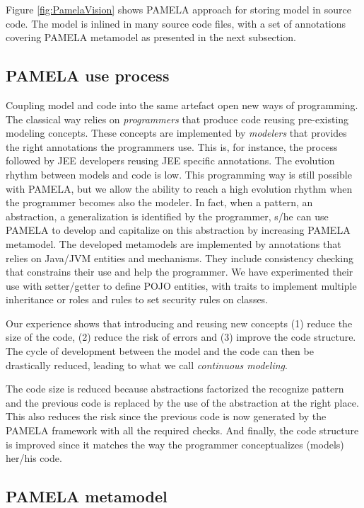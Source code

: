 Figure \ref{fig:PamelaVision} shows PAMELA approach for storing model in source code. The model is inlined in many source code files, with a set of annotations covering PAMELA metamodel as presented in the next subsection.

\subsection{PAMELA use process}

Coupling model and code into the same artefact open new ways of programming. The classical way relies on \emph{programmers} that produce code reusing pre-existing modeling concepts. These concepts are implemented by \emph{modelers} that provides the right annotations the programmers use. This is, for instance, the process followed by JEE developers reusing JEE specific annotations. The evolution rhythm between models and code is low. This programming way is still possible with PAMELA, but we allow the ability to reach a high evolution rhythm when the programmer becomes also the modeler. In fact, when a pattern, an abstraction, a generalization is identified by the programmer, s/he can use PAMELA to develop and capitalize on this abstraction by increasing PAMELA metamodel. 
The developed metamodels are implemented by annotations that relies on Java/JVM entities and mechanisms. They include consistency checking that constrains their use and help the programmer. We have experimented their use with setter/getter to define POJO entities, with traits to implement multiple inheritance or roles and rules to set security rules on classes.

Our experience shows that introducing and reusing new concepts (1) reduce the size of the code, (2) reduce the risk of errors and (3) improve the code structure. The cycle of development between the model and the code can then be drastically reduced, leading to what we call \emph{continuous modeling}.

The code size is reduced because abstractions factorized the recognize pattern and the previous code is replaced by the use of the abstraction at the right place. This also reduces the risk since the previous code is now generated by the PAMELA framework with all the required checks. And finally, the code structure is improved since it matches the way the programmer conceptualizes (models) her/his code. 

\subsection{PAMELA metamodel}

